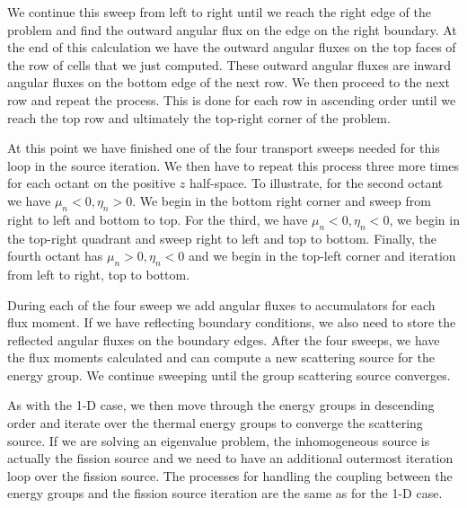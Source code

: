 We continue this sweep from left to right until we reach the right edge of the problem and find the outward angular flux on the edge on the right boundary. At the end of this calculation we have the outward angular fluxes on the top faces of the row of cells that we just computed. These outward angular fluxes are inward angular fluxes on the bottom edge of the next row. We then proceed to the next row and repeat the process. This is done for each row in ascending order until we reach the top row and ultimately the top-right corner of the problem.

At this point we have finished one of the four transport sweeps needed for this loop in the source iteration. We then have to repeat this process three more times for each octant on the positive $z$ half-space. To illustrate, for the second octant we have $\mu_n < 0, \eta_n > 0$. We begin in the bottom right corner and sweep from right to left and bottom to top. For the third, we have $\mu_n < 0, \eta_n < 0$, we begin in the top-right quadrant and sweep right to left and top to bottom. Finally, the fourth octant has $\mu_n > 0, \eta_n < 0$ and we begin in the top-left corner and iteration from left to right, top to bottom.

During each of the four sweep we add angular fluxes to accumulators for each flux moment. If we have reflecting boundary conditions, we also need to store the reflected angular fluxes on the boundary edges. After the four sweeps, we have the flux moments calculated and can compute a new scattering source for the energy group. We continue sweeping until the group scattering source converges.

As with the 1-D case, we then move through the energy groups in descending order and iterate over the thermal energy groups to converge the scattering source. If we are solving an eigenvalue problem, the inhomogeneous source is actually the fission source and we need to have an additional outermost iteration loop over the fission source. The processes for handling the coupling between the energy groups and the fission source iteration are the same as for the 1-D case.

